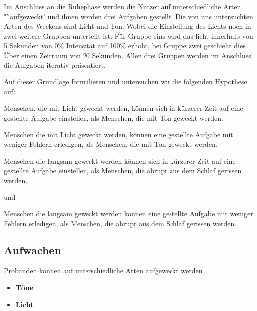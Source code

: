 Im Anschluss an die Ruhephase werden die Nutzer auf unterschiedliche Arten "`aufgeweckt' und ihnen werden drei Aufgaben gestellt. Die von uns untersuchten Arten des Weckens sind Licht und Ton. Wobei die Einstellung des Lichts noch in zwei weitere Gruppen unterteilt ist. Für Gruppe eins wird das licht innerhalb von 5 Sekunden von 0\% Intensität auf 100\% erhöht, bei Gruppe zwei geschieht dies Über einen Zeitraum von 20 Sekunden. 
Allen drei Gruppen werden im Anschluss die Aufgaben iterativ präsentiert.


Auf dieser Grundlage formulieren und untersuchen wir die folgenden Hypothese auf:

\begin{hyp}\label{hyp:lichtSchneller}
	Menschen, die mit Licht geweckt werden, können sich in kürzerer Zeit auf eine gestellte Aufgabe einstellen, als Menschen, die mit Ton geweckt werden.
\end{hyp}

\begin{hyp}\label{hyp:lichtErfolgreicher}
	Menschen die mit Licht geweckt werden, können eine gestellte Aufgabe mit weniger Fehlern erledigen, als Menschen, die mit Ton geweckt werden.
\end{hyp}

\begin{hyp}\label{hyp:langKurzSchneller}
	Menschen die langsam geweckt werden können sich in kürzerer Zeit auf eine gestellte Aufgabe einstellen, als Menschen, die abrupt aus dem Schlaf gerissen werden.
\end{hyp}

und 

\begin{hyp}\label{hyp:langKurzErfolgreicher}
	Menschen die langsam geweckt werden können eine gestellte Aufgabe mit weniger Fehlern erledigen, als Menschen, die abrupt aus dem Schlaf gerissen werden.
\end{hyp}

\subsection{Aufwachen}
Probanden können auf unterschiedliche Arten aufgeweckt werden~\cite{jewett1999time, ferrara2000sleep}
\begin{itemize}
	\item \textbf{Töne}
	\item \textbf{Licht}
\end{itemize}

